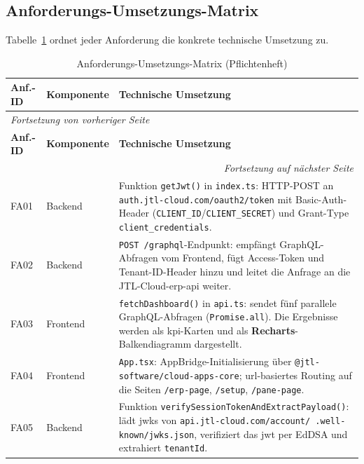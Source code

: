 \documentclass[11pt, a4paper, oneside]{report}
\begin{document}
\subsection*{Anforderungs-Umsetzungs-Matrix}

Tabelle~\ref{tab:pflichtenheft_matrix} ordnet jeder Anforderung die konkrete technische Umsetzung zu.

\begin{longtable}{@{} l l p{9cm} @{}}
  \caption{Anforderungs-Umsetzungs-Matrix (Pflichtenheft)}
  \label{tab:pflichtenheft_matrix} \\
  \toprule
  \textbf{Anf.-ID} & \textbf{Komponente} & \textbf{Technische Umsetzung} \\
  \midrule
  \endfirsthead
  \multicolumn{3}{l}{\small\textit{Fortsetzung von vorheriger Seite}} \\
  \toprule
  \textbf{Anf.-ID} & \textbf{Komponente} & \textbf{Technische Umsetzung} \\
  \midrule
  \endhead
  \midrule
  \multicolumn{3}{r}{\small\textit{Fortsetzung auf nächster Seite}} \\
  \endfoot
  \bottomrule
  \endlastfoot
  FA01 & Backend & Funktion \texttt{getJwt()} in \texttt{index.ts}: HTTP-POST an
                  \texttt{auth.jtl-cloud.com/oauth2/token} mit Basic-Auth-Header
                  (\texttt{CLIENT\_ID}/\texttt{CLIENT\_SECRET}) und Grant-Type
                  \texttt{client\_credentials}. \\[4pt]
  FA02 & Backend & \texttt{POST /graphql}-Endpunkt: empfängt GraphQL-Abfragen vom
                  Frontend, fügt Access-Token und Tenant-ID-Header hinzu und
                  leitet die Anfrage an die JTL-Cloud-\gls{erp}-\gls{api} weiter. \\[4pt]
  FA03 & Frontend & \texttt{fetchDashboard()} in \texttt{api.ts}: sendet fünf parallele
                   GraphQL-Abfragen (\texttt{Promise.all}). Die Ergebnisse werden als
                   \gls{kpi}-Karten und als \textbf{Recharts}-Balkendiagramm dargestellt. \\[4pt]
  FA04 & Frontend & \texttt{App.tsx}: AppBridge-Initialisierung über
                   \texttt{@jtl-software/cloud-apps-core}; \gls{url}-basiertes Routing
                   auf die Seiten \texttt{/erp-page}, \texttt{/setup}, \texttt{/pane-page}. \\[4pt]
  FA05 & Backend & Funktion \texttt{verifySessionTokenAndExtractPayload()}: lädt \gls{jwks}
                  von \texttt{api.jtl-cloud.com/account/\ .well-known/jwks.json},
                  verifiziert das \gls{jwt} per EdDSA und extrahiert \texttt{tenantId}. \\[4pt]

\end{longtable}
\end{document}
